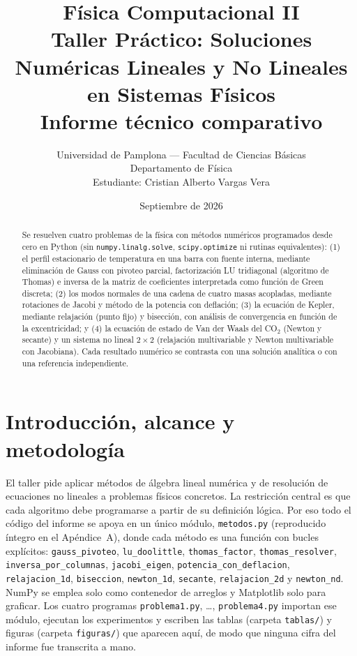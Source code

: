 \documentclass[11pt,a4paper]{article}
\title{\textbf{Física Computacional II}\\[2mm]
Taller Práctico: Soluciones Numéricas Lineales y No Lineales\\en Sistemas Físicos\\[3mm]
\large Informe técnico comparativo}
\author{Universidad de Pamplona --- Facultad de Ciencias Básicas\\Departamento de Física\\[2mm]
Estudiante: Cristian Alberto Vargas Vera }
\date{Septiembre de 2026}
\begin{document}
\maketitle
\begin{abstract}
Se resuelven cuatro problemas de la física con métodos numéricos programados desde cero en Python (sin \texttt{numpy.linalg.solve}, \texttt{scipy.optimize} ni rutinas equivalentes): (1) el perfil estacionario de temperatura en una barra con fuente interna, mediante eliminación de Gauss con pivoteo parcial, factorización LU tridiagonal (algoritmo de Thomas) e inversa de la matriz de coeficientes interpretada como función de Green discreta; (2) los modos normales de una cadena de cuatro masas acopladas, mediante rotaciones de Jacobi y método de la potencia con deflación; (3) la ecuación de Kepler, mediante relajación (punto fijo) y bisección, con análisis de convergencia en función de la excentricidad; y (4) la ecuación de estado de Van der Waals del CO$_2$ (Newton y secante) y un sistema no lineal $2\times2$ (relajación multivariable y Newton multivariable con Jacobiana). Cada resultado numérico se contrasta con una solución analítica o con una referencia independiente.
\end{abstract}

\tableofcontents
\newpage

\section{Introducción, alcance y metodología}
El taller pide aplicar métodos de álgebra lineal numérica y de resolución de ecuaciones no lineales a problemas físicos concretos. La restricción central es que cada algoritmo debe programarse a partir de su definición lógica. Por eso todo el código del informe se apoya en un único módulo, \texttt{metodos.py} (reproducido íntegro en el Apéndice~A), donde cada método es una función con bucles explícitos: \texttt{gauss\_pivoteo}, \texttt{lu\_doolittle}, \texttt{thomas\_factor}, \texttt{thomas\_resolver}, \texttt{inversa\_por\_columnas}, \texttt{jacobi\_eigen}, \texttt{potencia\_con\_deflacion}, \texttt{relajacion\_1d}, \texttt{biseccion}, \texttt{newton\_1d}, \texttt{secante}, \texttt{relajacion\_2d} y \texttt{newton\_nd}. NumPy se emplea solo como contenedor de arreglos y Matplotlib solo para graficar. Los cuatro programas \texttt{problema1.py}, \dots, \texttt{problema4.py} importan ese módulo, ejecutan los experimentos y escriben las tablas (carpeta \texttt{tablas/}) y figuras (carpeta \texttt{figuras/}) que aparecen aquí, de modo que ninguna cifra del informe fue transcrita a mano.
\end{document}
